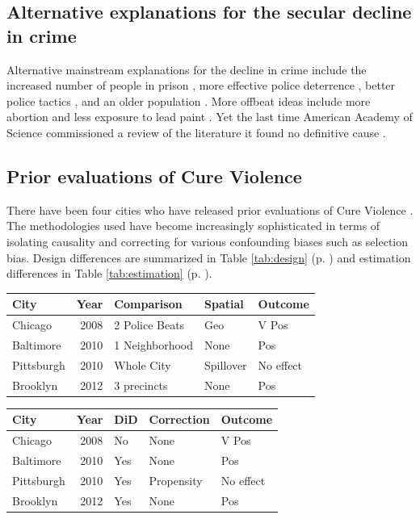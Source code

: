 \documentclass[11pt]{article}
\begin{document}
\subsection{Alternative explanations for the secular decline in crime}
\label{sec-3-1}

Alternative mainstream explanations for the decline in crime include
the increased number of people in prison
\parencite{levitt2004understanding}, more effective police deterrence
\parencite{braga2008pulling}, better police tactics
\parencite{capowich1995evaluating}, and an older population
\parencite{van2004criminal}. More offbeat ideas include more abortion
\parencite{donohue2001impact} and less exposure to lead paint
\parencite{nevin2000lead}.  Yet the last time American Academy of
Science commissioned a review of the literature it found no definitive
cause \parencite{blumstein2008factors}.
\subsection{Prior evaluations of Cure Violence}
\label{sec-3-2}

There have been four cities who have released prior evaluations of
Cure Violence
\parencite{skogan2008evaluation,webster2009interim,wilson2010community,picard2013testing}.
The methodologies used have become increasingly sophisticated in terms
of isolating causality and correcting for various confounding biases
such as selection bias.  Design differences are summarized in Table
\ref{tab:design} (p. \pageref{tab:design}) and estimation differences
in Table \ref{tab:estimation} (p. \pageref{tab:estimation}).

\begin{center}
\begin{tabular}{lrlll}
\hline
City & Year & Comparison & Spatial & Outcome\\
\hline
Chicago & 2008 & 2 Police Beats & Geo & V Pos\\
Baltimore & 2010 & 1 Neighborhood & None & Pos\\
Pittsburgh & 2010 & Whole City & Spillover & No effect\\
Brooklyn & 2012 & 3 precincts & None & Pos\\
\hline
\end{tabular}
\end{center}
\begin{center}
\begin{tabular}{lrlll}
\hline
City & Year & DiD & Correction & Outcome\\
\hline
Chicago & 2008 & No & None & V Pos\\
Baltimore & 2010 & Yes & None & Pos\\
Pittsburgh & 2010 & Yes & Propensity & No effect\\
Brooklyn & 2012 & Yes & None & Pos\\
\hline
\end{tabular}
\end{center}
\end{document}
